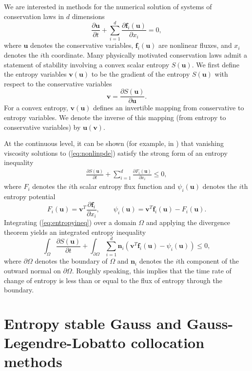 \documentclass[review,onefignum,onetabnum,final]{siamart171218}
\newcommand{\pd}[2]{\frac{\partial#1}{\partial#2}}
\newcommand{\LRp}[1]{\left( #1 \right)}
\begin{document}
We are interested in methods for the numerical solution of systems of conservation laws in $d$ dimensions
\begin{equation}
\pd{\bm{u}}{t} + \sum_{i=1}^d \pd{\bm{f}_i\LRp{\bm{u}}}{x_i} = 0,
\label{eq:nonlinpde}
\end{equation}
where $\bm{u}$ denotes the conservative variables, $\bm{f}_i(\bm{u})$ are nonlinear fluxes, and $x_i$ denotes the $i$th coordinate.  Many physically motivated conservation laws admit a statement of stability involving a convex scalar entropy $S(\bm{u})$.  We first define the entropy variables $\bm{v}(\bm{u})$ to be the gradient of the entropy $S(\bm{u})$ with respect to the conservative variables 
\[
\bm{v} = \pd{S(\bm{u})}{\bm{u}}.  
\]
For a convex entropy, $\bm{v}(\bm{u})$ defines an invertible mapping from conservative to entropy variables.  We denote the inverse of this mapping (from entropy to conservative variables) by $\bm{u}(\bm{v})$.  

At the continuous level, it can be shown (for example, in \cite{dafermos2005compensated}) that vanishing viscosity solutions to (\ref{eq:nonlinpde}) satisfy the strong form of an entropy inequality 
\begin{gather}
\pd{S(\bm{u})}{t} + \sum_{i=1}^d \pd{F_i(\bm{u})}{x_i} \leq 0,
\label{eq:entropyineq}
\end{gather}
where $F_i$ denotes the $i$th scalar entropy flux function and $\psi_i(\bm{u})$ denotes the $i$th entropy potential
\[
F_i(\bm{u}) = \bm{v}^T\pd{\bm{f}_i}{x_i}, \qquad \psi_i(\bm{u}) = \bm{v}^T\bm{f}_i(\bm{u}) - F_i(\bm{u}). 
\]
Integrating (\ref{eq:entropyineq}) over a domain $\Omega$ and applying the divergence theorem yields an integrated entropy inequality
\begin{equation}
\int_{\Omega} \pd{S(\bm{u})}{t} + \int_{\partial \Omega} \sum_{i=1}^d \bm{n}_i \LRp{\bm{v}^T\bm{f}_i(\bm{u}) - \psi_i(\bm{u})} \leq 0,
\label{eq:weakentropyineq}
\end{equation}
where $\partial \Omega$ denotes the boundary of $\Omega$ and $\bm{n}_i$ denotes the $i$th component of the outward normal on $\partial \Omega$.  Roughly speaking, this implies that the time rate of change of entropy is less than or equal to the flux of entropy through the boundary.


\section{Entropy stable Gauss and Gauss-Legendre-Lobatto collocation methods}
\label{sec:1}
\end{document}
